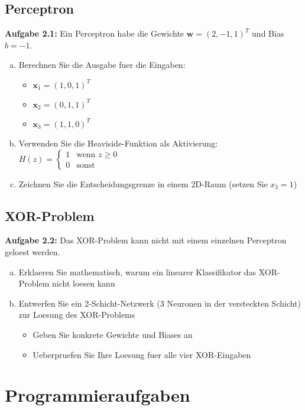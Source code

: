 ﻿\documentclass[12pt,a4paper]{article}
\begin{document}
\subsection{Perceptron}

\textbf{Aufgabe 2.1:} Ein Perceptron habe die Gewichte $\mathbf{w} = (2, -1, 1)^T$ und Bias $b = -1$.

\begin{enumerate}[(a)]
    \item Berechnen Sie die Ausgabe fuer die Eingaben:
    \begin{itemize}
        \item $\mathbf{x}_1 = (1, 0, 1)^T$
        \item $\mathbf{x}_2 = (0, 1, 1)^T$
        \item $\mathbf{x}_3 = (1, 1, 0)^T$
    \end{itemize}
    \item Verwenden Sie die Heaviside-Funktion als Aktivierung: $H(z) = \begin{cases} 1 & \text{wenn } z \geq 0 \\ 0 & \text{sonst} \end{cases}$
    \item Zeichnen Sie die Entscheidungsgrenze in einem 2D-Raum (setzen Sie $x_3 = 1$)
\end{enumerate}

\subsection{XOR-Problem}

\textbf{Aufgabe 2.2:} Das XOR-Problem kann nicht mit einem einzelnen Perceptron geloest werden.

\begin{enumerate}[(a)]
    \item Erklaeren Sie mathematisch, warum ein linearer Klassifikator das XOR-Problem nicht loesen kann
    \item Entwerfen Sie ein 2-Schicht-Netzwerk (3 Neuronen in der versteckten Schicht) zur Loesung des XOR-Problems
    \begin{itemize}
        \item Geben Sie konkrete Gewichte und Biases an
        \item Ueberpruefen Sie Ihre Loesung fuer alle vier XOR-Eingaben
    \end{itemize}
\end{enumerate}

\section{Programmieraufgaben}
\end{document}
